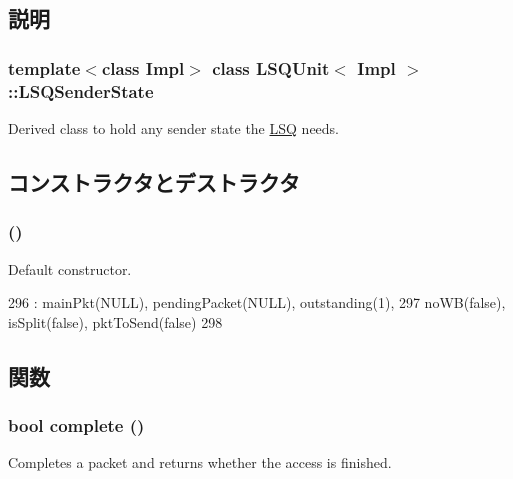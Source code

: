 \subsection{説明}
\subsubsection*{template$<$class Impl$>$ class LSQUnit$<$ Impl $>$::LSQSenderState}

Derived class to hold any sender state the \hyperlink{classLSQ}{LSQ} needs. 

\subsection{コンストラクタとデストラクタ}
\hypertarget{classLSQUnit_1_1LSQSenderState_a0f4caf0593be7a2d809d7335984820d2}{
\subsubsection[{LSQSenderState}]{ ()}}
\label{classLSQUnit_1_1LSQSenderState_a0f4caf0593be7a2d809d7335984820d2}
Default constructor. 


\begin{DoxyCode}
296             : mainPkt(NULL), pendingPacket(NULL), outstanding(1),
297               noWB(false), isSplit(false), pktToSend(false)
298           { }
\end{DoxyCode}


\subsection{関数}
\hypertarget{classLSQUnit_1_1LSQSenderState_a052a3064081f9c45c97b467fba70b73b}{
\subsubsection[{complete}]{\setlength{\rightskip}{0pt plus 5cm}bool complete ()}}
\label{classLSQUnit_1_1LSQSenderState_a052a3064081f9c45c97b467fba70b73b}
Completes a packet and returns whether the access is finished. 


